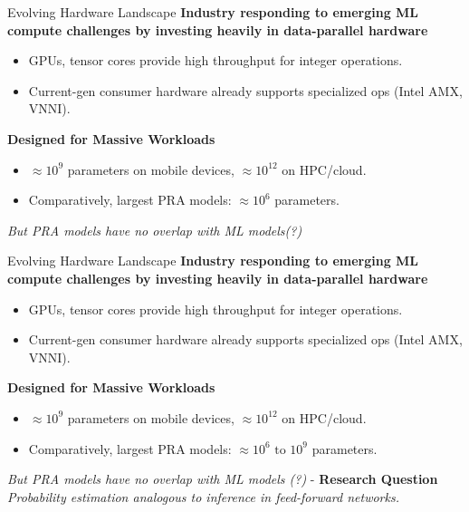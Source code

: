 \begin{frame}[t]{Evolving Hardware Landscape}
\textbf{Industry responding to emerging ML compute challenges by investing heavily in data-parallel hardware}
  \begin{itemize} 
    \item GPUs, tensor cores provide high throughput for integer operations.
    \item Current-gen consumer hardware already supports specialized ops (Intel AMX, VNNI).
  \end{itemize}
  \vspace{8pt}
\textbf{Designed for Massive Workloads}
  \begin{itemize} 
    \item $\approx10^9$ parameters on mobile devices, $\approx10^{12}$ on HPC/cloud.
    \item Comparatively, largest PRA models: $\approx10^6$ parameters.
  \end{itemize}
      \vspace{12pt}
  \textit{But PRA models have no overlap with ML models(?)}\\
\end{frame}

\begin{frame}[t]{Evolving Hardware Landscape}
\textbf{Industry responding to emerging ML compute challenges by investing heavily in data-parallel hardware}
  \begin{itemize} 
    \item GPUs, tensor cores provide high throughput for integer operations.
    \item Current-gen consumer hardware already supports specialized ops (Intel AMX, VNNI).
  \end{itemize}
  \vspace{8pt}
\textbf{Designed for Massive Workloads}
  \begin{itemize} 
    \item $\approx10^9$ parameters on mobile devices, $\approx10^{12}$ on HPC/cloud.
    \item Comparatively, largest PRA models: $\approx10^6 \text{ to } 10^9$ parameters.
  \end{itemize}
    \vspace{12pt}
\textit{But PRA models have no overlap with ML models (?)} - \textbf{Research Question}\\
\textit{Probability estimation analogous to inference in feed-forward networks.}
\end{frame}

